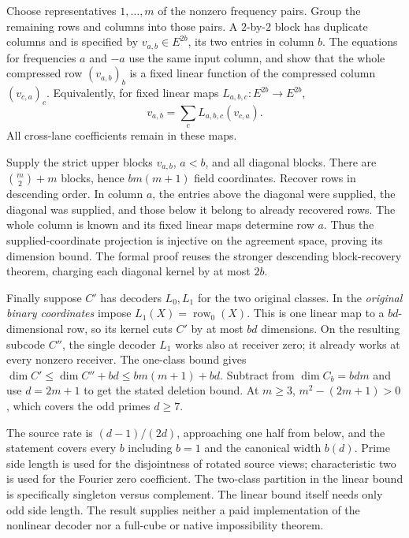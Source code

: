 \begin{outline}
Choose representatives $1,\ldots,m$ of the nonzero frequency pairs.
Group the remaining rows and columns into those pairs. A $2$-by-$2$
block has duplicate columns and is specified by
$v_{a,b}\in E^{2b}$, its two entries in column $b$. The equations for
frequencies $a$ and $-a$ use the same input column, and show that the
whole compressed row $(v_{a,b})_b$ is a fixed linear function of the
compressed column $(v_{c,a})_c$. Equivalently, for fixed linear maps
$L_{a,b,c}:E^{2b}\to E^{2b}$,
\[
 v_{a,b}=\sum_c L_{a,b,c}(v_{c,a}).
\]
All cross-lane coefficients remain in these maps.

Supply the strict upper blocks $v_{a,b}$, $a<b$, and all diagonal blocks.
There are $\binom m2+m$ blocks, hence $bm(m+1)$ field coordinates.
Recover rows in descending order. In column $a$, the entries above the
diagonal were supplied, the diagonal was supplied, and those below it
belong to already recovered rows. The whole column is known and its fixed
linear maps determine row $a$. Thus the supplied-coordinate projection is
injective on the agreement space, proving its dimension bound. The formal
proof reuses the stronger descending block-recovery theorem, charging each
diagonal kernel by at most $2b$.

Finally suppose $C'$ has decoders $L_0,L_1$ for the two original classes.
In the \emph{original binary coordinates} impose
$L_1(X)=\operatorname{row}_0(X)$. This is one linear map to a $bd$-dimensional
row, so its kernel cuts $C'$ by at most $bd$ dimensions. On the resulting
subcode $C''$, the single decoder $L_1$ works also at receiver zero; it
already works at every nonzero receiver. The one-class bound gives
$\dim C'\le\dim C''+bd\le bm(m+1)+bd$. Subtract from
$\dim C_b=bdm$ and use $d=2m+1$ to get the stated deletion bound.
At $m\ge3$, $m^2-(2m+1)>0$, which covers the odd primes $d\ge7$.
\end{outline}

The source rate is $(d-1)/(2d)$, approaching one half from below, and the
statement covers every $b$ including $b=1$ and the canonical width $b(d)$.
Prime side length is used for the disjointness of rotated source views;
characteristic two is used for the Fourier zero coefficient. The
two-class partition in the linear bound is specifically singleton versus
complement. The linear bound itself needs only odd side length. The
result supplies neither a paid implementation of the nonlinear decoder
nor a full-cube or native impossibility theorem.
